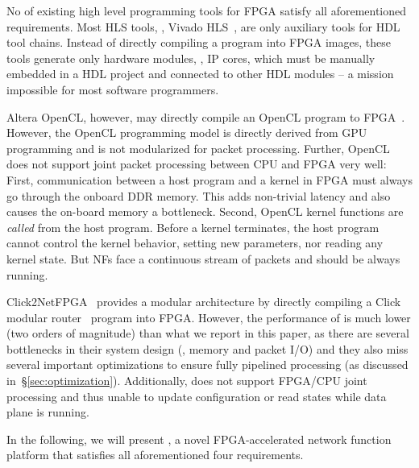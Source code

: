 No of existing high level programming tools for FPGA satisfy all aforementioned requirements.
Most HLS tools, \eg, Vivado HLS~\cite{vivado}, are only auxiliary tools 
for HDL tool chains. 
Instead of directly compiling a program into FPGA images, these tools generate only hardware 
modules, \ie, IP cores, which must be manually embedded in a HDL project and connected to other HDL modules
-- a mission impossible for most software programmers. 

Altera OpenCL, however, may directly compile an OpenCL program to FPGA~\cite{aoc}. 
However, the OpenCL programming model is directly derived from GPU programming and 
is not modularized for packet processing. 
%
Further, OpenCL does not support joint packet processing between CPU and FPGA very well:
%
First, communication between a host program and a kernel in FPGA must always go through the onboard DDR memory. This adds non-trivial latency
and also causes the on-board memory a bottleneck.
%
Second, OpenCL kernel functions are \textit{called} from the host program. 
Before a kernel terminates, the host program cannot control the kernel behavior, \eg setting new parameters, nor reading any kernel state. 
But NFs face a continuous stream of packets and should be always running.

Click2NetFPGA~\cite{Click2NetFPGA} provides a modular architecture by 
directly compiling a Click modular router~\cite{kohler2000click} program into FPGA.
%
However, the performance of \cite{Click2NetFPGA} is much lower (two orders of magnitude) than what we report in this paper, as there are several bottlenecks in their system design (\eg, memory and packet I/O) and they also miss 
several important
optimizations to ensure fully pipelined processing (as discussed in~\S\ref{sec:optimization}). 
Additionally, \cite{Click2NetFPGA} does not support FPGA/CPU joint processing and thus unable to update configuration or read states while data plane is running.


In the following, we will present \name, a novel FPGA-accelerated 
network function platform that satisfies all aforementioned four requirements.


